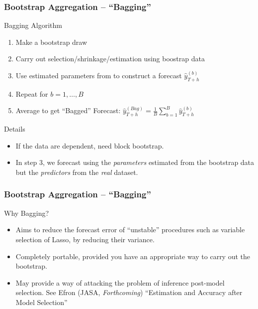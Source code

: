 \documentclass[handout]{beamer}
\begin{document}
\begin{frame}[c]\frametitle{Bootstrap Aggregation -- ``Bagging''}
    

\begin{block}
	{Bagging Algorithm}
	\begin{enumerate}
		\item Make a bootstrap draw  
		\item Carry out selection/shrinkage/estimation using boostrap data
		\item Use estimated parameters from to construct a forecast $\widehat{y}_{T+h}^{(b)}$
		\item Repeat for $b = 1, \hdots, B$
		\item Average to get ``Bagged'' Forecast: $\widehat{y}_{T+h}^{(Bag)} = \frac{1}{B}\sum_{b=1}^B \widehat{y}_{T+h}^{(b)}$
	\end{enumerate}
\end{block}

\begin{block}
	{Details}
	\begin{itemize}
		\item If the data are dependent, need block bootstrap.
		\item In step 3, we forecast using the \emph{parameters} estimated from the bootstrap data but the \emph{predictors} from the \emph{real} dataset.
	\end{itemize}
\end{block}

\end{frame}
\begin{frame}[c]\frametitle{Bootstrap Aggregation -- ``Bagging''}

\begin{block}
 	{Why Bagging?}
 		\begin{itemize}
 			\item Aims to reduce the forecast error of ``unstable'' procedures such as variable selection of Lasso, by reducing their variance.
 			\item Completely portable, provided you have an appropriate way to carry out the bootstrap.
 			\item May provide a way of attacking the problem of inference post-model selection. See Efron (JASA, \emph{Forthcoming}) ``Estimation and Accuracy after Model Selection''
 		\end{itemize}
 \end{block} 


\end{frame}
\end{document}
